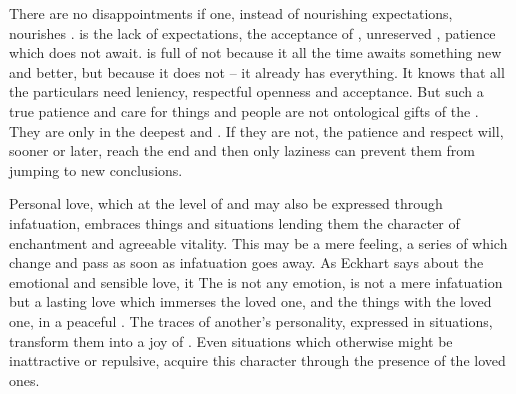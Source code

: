 There are no disappointments if one, instead of nourishing expectations,
nourishes .  is the lack of expectations, the acceptance of
, unreserved , patience which does not await. 
is full of  not because it all the time awaits something new and
better, but because it does not -- it already has everything. It knows that all
the particulars need leniency, respectful openness and acceptance.  But such a
true patience and care for things and people are not ontological gifts of the
. They are  only in the deepest  and
. If they are not, the patience and respect will, sooner or later,
reach the end and then only laziness can prevent them from jumping to new
conclusions.


\pa \act Personal love, which at the level of  and  may
also be expressed through infatuation, embraces things and situations lending
them the character of enchantment and agreeable vitality.  This may be a mere
feeling, a series of  which change and pass as soon as
infatuation goes away. As Eckhart says about the emotional and sensible love, it
 The 
is not any emotion, is not a mere infatuation but a lasting love which immerses
the loved one, and the things  with the loved one, in a peaceful
.  The traces of another's personality, expressed in 
situations, transform them into a joy of . Even situations
which otherwise might be inattractive or repulsive, acquire this character
through the presence of the loved ones.

